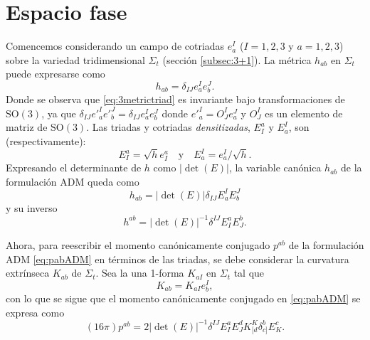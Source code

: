 \section{Espacio fase}

Comencemos considerando un campo de cotriadas $e^{I}_{a}$ ($I=1,2,3$ y $a=1,2,3$) sobre la variedad  tridimensional $\Sigma_{t}$ (secci\'{o}n \ref{subsec:3+1}). La m\'{e}trica $h_{ab}$ en $\Sigma_{t}$ puede expresarse como\footnotemark
{}
%
\begin{equation}
\label{eq:3metrictriad}
h_{ab} = \delta_{IJ} e^{I}_{a} e^{J}_{b}.
\end{equation}
%
Donde se observa que \eqref{eq:3metrictriad} es invariante bajo transformaciones de $\mathrm{SO}(3)$, ya que $\delta_{IJ} e'^{I}_{a} e'^{J}_{b} = \delta_{IJ} e^{I}_{a} e^{J}_{b}$ donde $e'^{I}_{a} = O^{I}_{J} e^{J}_{a}$ y $O^{I}_{J}$ es un elemento de matriz de $\mathrm{SO}(3)$. Las triadas y cotriadas \emph{densitizadas}, $E^{a}_{I}$ y $E^{I}_{a}$, son (respectivamente):
%
\begin{equation*}
E^{a}_{I} = \sqrt{h} e^{a}_{I} \quad \mathrm{y} \quad E^{I}_{a} = e^{I}_{a}/\sqrt{h}.
\end{equation*}
%
Expresando el determinante de $h$ como $|\det(E)|$, la variable can\'{o}nica $h_{ab}$ de la formulaci\'{o}n ADM queda como
%
\begin{equation}
\label{eq:habEE}
h_{ab} = |\det(E)| \delta_{IJ} E^{I}_{a} E^{J}_{b}
\end{equation}
%
y su inverso
%
\begin{equation}
h^{ab} = |\det(E)|^{-1} \delta^{IJ} E^{a}_{I} E^{b}_{J}.
\end{equation}

Ahora, para reescribir el momento can\'{o}nicamente conjugado $p^{ab}$ de la formulaci\'{o}n ADM \eqref{eq:pabADM} en t\'{e}rminos de las triadas, se debe considerar la curvatura extr\'{i}nseca $K_{ab}$ de $\Sigma_{t}$. Sea la una 1-forma $K_{aI}$ en $\Sigma_{t}$ tal que
%
\begin{equation}
K_{ab} = K_{aI} e^{I}_{b},
\end{equation}
%
con lo que se sigue que el momento can\'{o}nicamente conjugado en \eqref{eq:pabADM} se expresa como
%
\begin{equation}
\label{eq:pabEE}
(16 \pi)p^{ab} = 2 |\det(E)|^{-1} \delta^{IJ} E^{a}_{I} E^{d}_{J} K^{K}_{[d} \delta^{b}_{c]} E^{c}_{K}.
\end{equation}

